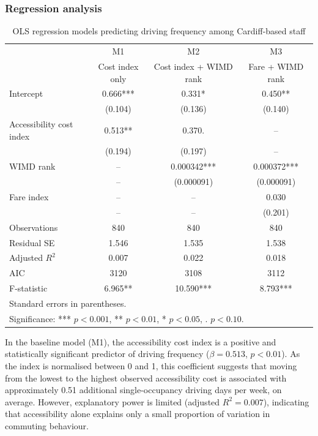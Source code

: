 \documentclass[11pt,a4paper]{article}
\begin{document}
\subsubsection{Regression analysis}

\begin{table}[H]
\centering
\caption{OLS regression models predicting driving frequency among Cardiff-based staff}
\label{tab:ols_driving_models}
\begin{tabular}{lccc}
\hline
 & M1 & M2 & M3 \\
 & Cost index only & Cost index + WIMD rank & Fare + WIMD rank \\
\hline
Intercept & 0.666*** & 0.331* & 0.450** \\
          & (0.104)  & (0.136) & (0.140) \\
Accessibility cost index & 0.513** & 0.370. & -- \\
                         & (0.194) & (0.197) & -- \\
WIMD rank & -- & 0.000342*** & 0.000372*** \\
          & -- & (0.000091) & (0.000091) \\
Fare index & -- & -- & 0.030 \\
           & -- & -- & (0.201) \\
\hline
Observations & 840 & 840 & 840 \\
Residual SE & 1.546 & 1.535 & 1.538 \\
Adjusted $R^2$ & 0.007 & 0.022 & 0.018 \\
AIC & 3120 & 3108 & 3112 \\
F-statistic & 6.965** & 10.590*** & 8.793*** \\
\hline
\multicolumn{4}{l}{\footnotesize Standard errors in parentheses.} \\
\multicolumn{4}{l}{\footnotesize Significance: *** $p<0.001$, ** $p<0.01$, * $p<0.05$, . $p<0.10$.} \\
\end{tabular}
\end{table}

In the baseline model (M1), the accessibility cost index is a positive and statistically significant predictor of driving frequency (\(\beta = 0.513\), \(p < 0.01\)). As the index is normalised between 0 and 1, this coefficient suggests that moving from the lowest to the highest observed accessibility cost is associated with approximately 0.51 additional single-occupancy driving days per week, on average. However, explanatory power is limited (adjusted \(R^2 = 0.007\)), indicating that accessibility alone explains only a small proportion of variation in commuting behaviour.
\end{document}
